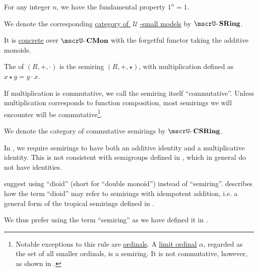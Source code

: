 \begin{definition}
\begin{thmenum}
    For any integer \( n \), we have the fundamental property \( 1^n = 1 \).

     We denote the corresponding \hyperref[def:category_of_small_first_order_models]{category of \( \mscrU \)-small models} by \( \ucat{SRing} \).

    It is \hyperref[def:concrete_category]{concrete} over \hyperref[def:monoid]{\( \ucat{CMon} \)} with the forgetful functor taking the additive monoids.

     The  of \( (R, +, \cdot) \) is the semiring \( (R, +, \star) \), with multiplication defined as \( x \star y = y \cdot x \).

     If multiplication is commutative, we call the semiring itself \enquote{commutative}. Unless multiplication corresponds to function composition, most semirings we will encounter will be commutative\footnote{
    Notable exceptions to this rule are \hyperref[def:ordinal]{ordinals}. A \hyperref[def:successor_and_limit_ordinal]{limit ordinal} \( \alpha \), regarded as the set of all smaller ordinals, is a semiring. It is not commutative, however, as shown in .}.

    We denote the category of commutative semirings by \( \ucat{CSRing} \).
  \end{thmenum}
\end{definition}

\begin{remark}\label{rem:semiring_etymology}
  In , we require semirings to have both an additive identity and a multiplicative identity. This is not consistent with semigroups defined in , which in general do not have identities.

   suggest using \enquote{dioid} (short for \enquote{double monoid}) instead of \enquote{semiring}.  describes how the term \enquote{dioid} may refer to semirings with idempotent addition, i.e. a general form of the tropical semirings defined in .

  We thus prefer using the term \enquote{semiring} as we have defined it in .
\end{remark}

